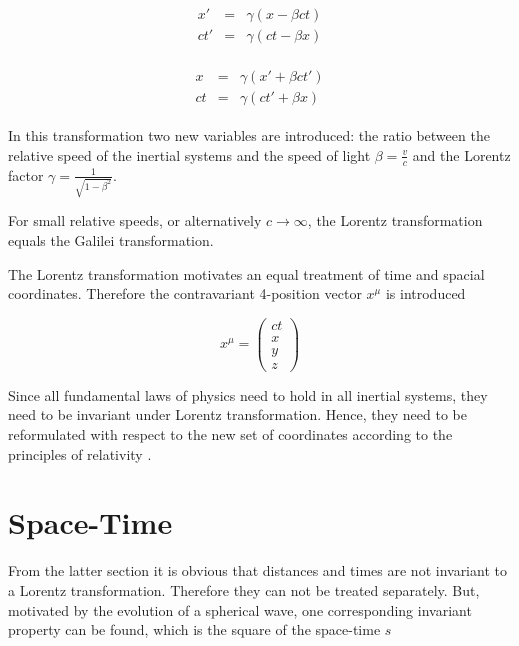 \begin{eqnarray}\begin{array}{rcl}\label{lorentz1}
 x'  &=& \gamma\left(x-\beta ct\right)\\
 ct' &=& \gamma\left(ct-\beta x\right)
\end{array}\end{eqnarray}

\begin{eqnarray}\begin{array}{rcl}\label{lorentz2}
 x   &=& \gamma\left(x'+\beta ct'\right)\\
 ct  &=& \gamma\left(ct'+\beta x\right)
\end{array}\end{eqnarray}

In this transformation two new variables are introduced: the ratio between the relative speed
of the inertial systems and the speed of light $\beta = \frac vc$ and the
Lorentz factor $\gamma = \frac 1{\sqrt{1-\beta^2}}$.

For small relative speeds, or alternatively $c\rightarrow\infty$, the Lorentz
transformation equals the Galilei transformation.

The Lorentz transformation motivates an equal treatment of time and spacial
coordinates. Therefore the contravariant 4-position vector $x^\mu$ is introduced

\begin{equation}
 x^\mu = \begin{pmatrix}
          ct \\ x \\ y \\ z
         \end{pmatrix}
\end{equation}

Since all fundamental laws of physics need to hold in all inertial systems,
they need to be invariant under Lorentz transformation. Hence, they need to be
reformulated with respect to the new set of coordinates according to
the principles of relativity \cite{einstein88}.


\section{Space-Time}
From the latter section it is obvious that distances and times are not
invariant to a Lorentz transformation. Therefore they can not be treated
separately. But, motivated by the evolution of a spherical wave, one corresponding
invariant property can be found, which is the square of the space-time $s$

